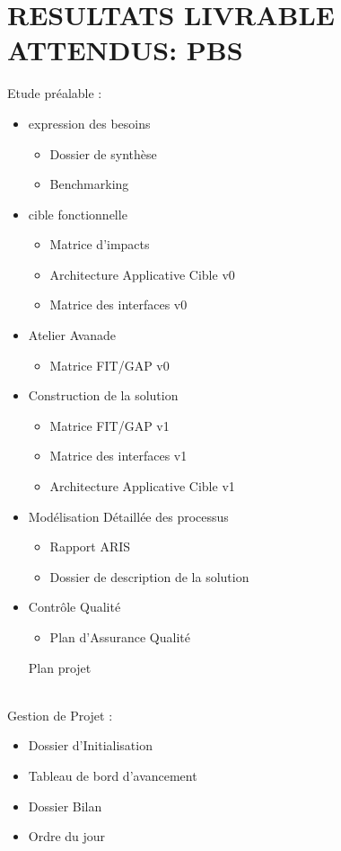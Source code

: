 \documentclass[]{scrartcl}
\begin{document}
\newpage
\section{RESULTATS LIVRABLE ATTENDUS: PBS}

Etude préalable : 
\begin{itemize}
\item expression des besoins
\begin{itemize}
\item Dossier de synthèse
\item Benchmarking
\end{itemize}
\item cible fonctionnelle
\begin{itemize}
\item Matrice d'impacts
\item Architecture Applicative Cible v0
\item Matrice des interfaces v0
\end{itemize}
\item Atelier Avanade
\begin{itemize}
\item Matrice FIT/GAP v0
\end{itemize}
\item Construction de la solution
\begin{itemize}
\item Matrice FIT/GAP v1
\item Matrice des interfaces v1
\item Architecture Applicative Cible v1
\end{itemize}
\item Modélisation Détaillée des processus
\begin{itemize}
\item Rapport ARIS
\item Dossier de description de la solution
\end{itemize}
\item Contrôle Qualité
\begin{itemize}
\item Plan d'Assurance Qualité
\end{itemize}
\item [Plan projet]
\end{itemize}
\ \\
Gestion de Projet : 
\begin{itemize}
\item Dossier d'Initialisation
\item Tableau de bord d'avancement
\item Dossier Bilan
\item Ordre du jour
\end{itemize}
\end{document}
